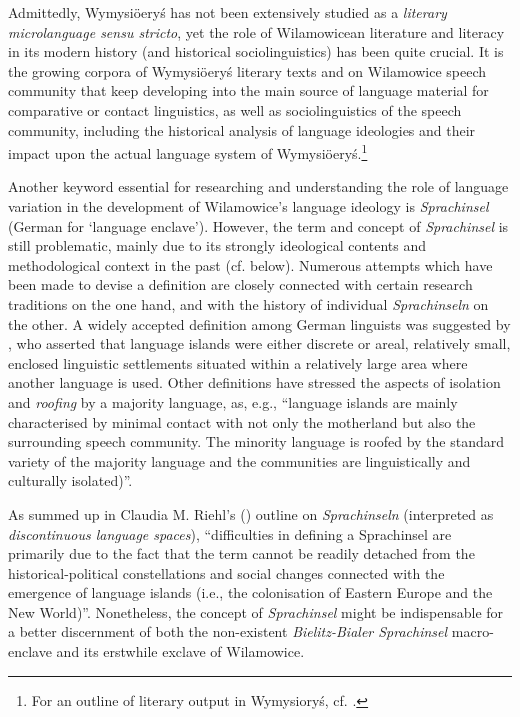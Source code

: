 \documentclass[output=paper]{langscibook}
\begin{document}
Admittedly, Wymysiöeryś has not been extensively studied as a \textit{literary microlanguage sensu stricto}, yet the role of Wilamowicean literature and literacy in its modern history (and historical sociolinguistics) has been quite crucial. It is the growing corpora of Wymysiöeryś literary texts and on Wilamowice speech community that keep developing into the main source of language material for comparative or contact linguistics, as well as sociolinguistics of the speech community, including the historical analysis of language ideologies and their impact upon the actual language system of Wymysiöeryś.\footnote{For an outline of literary output in Wymysioryś, cf. \citealt{wicherkiewicz_mikroliteratura_2019}.}

Another keyword essential for researching and understanding the role of language variation in the development of Wilamowice’s language ideology is \textit{Sprachinsel} (German for ‘language enclave’). However, the term and concept of \textit{Sprachinsel} is still problematic, mainly due to its strongly ideological contents and methodological context in the past (cf. below). Numerous attempts which have been made to devise a definition are closely connected with certain research traditions on the one hand, and with the history of individual \textit{Sprachinseln} on the other. A widely accepted definition among German linguists was suggested by \citet[901]{wiesinger1983deutsche}, who asserted that language islands were either discrete or areal, relatively small, enclosed linguistic settlements situated within a relatively large area where another language is used. Other definitions have stressed the aspects of isolation and \textit{roofing} by a majority language, as, e.g., \citet[55]{protze_erforschung_1995} “language islands are mainly characterised by minimal contact with not only the motherland but also the surrounding speech community. The minority language is roofed by the standard variety of the majority language and the communities are linguistically and culturally isolated)”. 

As summed up in Claudia M. Riehl's (\citeyear[333]{riehl_discontinous_2010}) outline on \textit{Sprachinseln} (interpreted as \textit{discontinuous language spaces}), “difficulties in defining a Sprachinsel are primarily due to the fact that the term cannot be readily detached from the historical-political constellations and social changes connected with the emergence of language islands (i.e., the colonisation of Eastern Europe and the New World)”. Nonetheless, the concept of \textit{Sprachinsel} might be indispensable for a better discernment of both the non-existent \textit{Bielitz-Bialer Sprachinsel} macro-enclave and its erstwhile exclave of Wilamowice.
\end{document}
